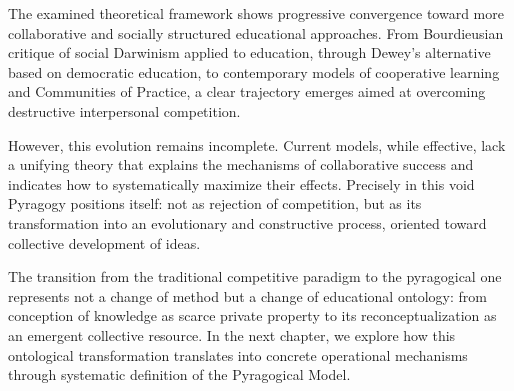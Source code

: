 The examined theoretical framework shows progressive convergence toward more collaborative and socially structured educational approaches. From Bourdieusian critique of social Darwinism applied to education, through Dewey's alternative based on democratic education, to contemporary models of cooperative learning and Communities of Practice, a clear trajectory emerges aimed at overcoming destructive interpersonal competition.

However, this evolution remains incomplete. Current models, while effective, lack a unifying theory that explains the mechanisms of collaborative success and indicates how to systematically maximize their effects. Precisely in this void Pyragogy positions itself: not as rejection of competition, but as its transformation into an evolutionary and constructive process, oriented toward collective development of ideas.

The transition from the traditional competitive paradigm to the pyragogical one represents not a change of method but a change of educational ontology: from conception of knowledge as scarce private property to its reconceptualization as an emergent collective resource. In the next chapter, we explore how this ontological transformation translates into concrete operational mechanisms through systematic definition of the Pyragogical Model.